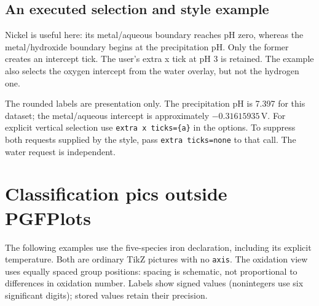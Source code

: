 \documentclass[a4paper,11pt]{ltxdoc}
\begin{document}
\subsection{An executed selection and style example}
Nickel is useful here: its metal/aqueous boundary reaches pH zero, whereas the
metal/hydroxide boundary begins at the precipitation pH. Only the former creates
an intercept tick. The user's extra x tick at pH 3 is retained. The example also
selects the oxygen intercept from the water overlay, but not the hydrogen one.
\begin{codeexample}[width=11cm]
\end{codeexample}
The rounded labels are presentation only. The precipitation pH is 7.397 for
this dataset; the metal/aqueous intercept is approximately $-0.31615935\,\mathrm V$.
For explicit vertical selection use \texttt{extra x ticks=\{a\}} in the
 options. To suppress both requests supplied by the style, pass
\texttt{extra ticks=none} to that call. The water request is independent.

\section{Classification pics outside PGFPlots}
The following examples use the five-species iron declaration, including its
explicit temperature. Both are ordinary TikZ pictures with no \texttt{axis}.
The oxidation view uses equally spaced group positions: spacing is schematic,
not proportional to differences in oxidation number. Labels show signed values
(nonintegers use six significant digits); stored values retain their precision.
\end{document}
